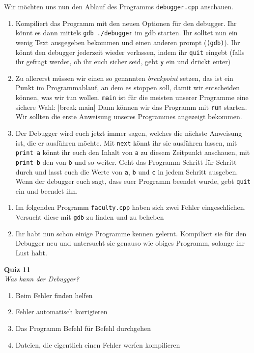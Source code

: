 \newpage

\begin{praxis}

    Wir möchten uns nun den Ablauf des Programms \texttt{debugger.cpp} anschauen.

    \begin{enumerate}
        \item Kompiliert das Programm mit den neuen Optionen für den debugger. Ihr
              könnt es dann mittels \verb|gdb ./debugger| im gdb starten. Ihr solltet
              nun ein wenig Text ausgegeben bekommen und einen anderen prompt
              (\texttt{(gdb)}). Ihr könnt den debugger jederzeit wieder verlassen,
              indem ihr \texttt{quit} eingebt (falls ihr gefragt werdet, ob ihr euch
              sicher seid, gebt \texttt{y} ein und drückt enter)
        \item Zu allererst müssen wir einen so genannten \emph{breakpoint} setzen,
              das ist ein Punkt im Programmablauf, an dem es stoppen soll, damit wir
              entscheiden können, was wir tun wollen. \texttt{main} ist für die
              meisten unserer Programme eine sichere Wahl:
              |break main|
              Dann können wir das Programm mit \texttt{run} starten. Wir sollten die
              erste Anweisung unseres Programmes angezeigt bekommen.
        \item Der Debugger wird euch jetzt immer sagen, welches die nächste
              Anweisung ist, die er ausführen möchte. Mit \texttt{next} könnt ihr sie
              ausführen lassen, mit \texttt{print a} könnt ihr euch den Inhalt von
              \texttt{a} zu diesem Zeitpunkt anschauen, mit \texttt{print b} den von
              \texttt{b} und so weiter. Geht das Programm Schritt für Schritt durch
              und lasst euch die Werte von \texttt{a}, \texttt{b} und \texttt{c} in
              jedem Schritt ausgeben. Wenn der debugger euch sagt, dass euer Programm
              beendet wurde, gebt \texttt{quit} ein und beendet ihn.
    \end{enumerate}
\end{praxis}

\begin{spiel}
\begin{enumerate}
        \item Im folgenden Programm \texttt{faculty.cpp} haben sich zwei Fehler eingeschlichen. Versucht diese mit \texttt{gdb} zu finden und zu beheben
        
        
        \item Ihr habt nun schon einige Programme kennen gelernt. Kompiliert sie
              für den Debugger neu und untersucht sie genauso wie obiges Programm,
              solange ihr Lust habt.
\end{enumerate}
\end{spiel}

\textbf{Quiz 11}\\
\textit{Was kann der Debugger?}
\begin{enumerate}[label=\alph*)]
    \item Beim Fehler finden helfen
    \item Fehler automatisch korrigieren
    \item Das Programm Befehl für Befehl durchgehen
    \item Dateien, die eigentlich einen Fehler werfen kompilieren
\end{enumerate}